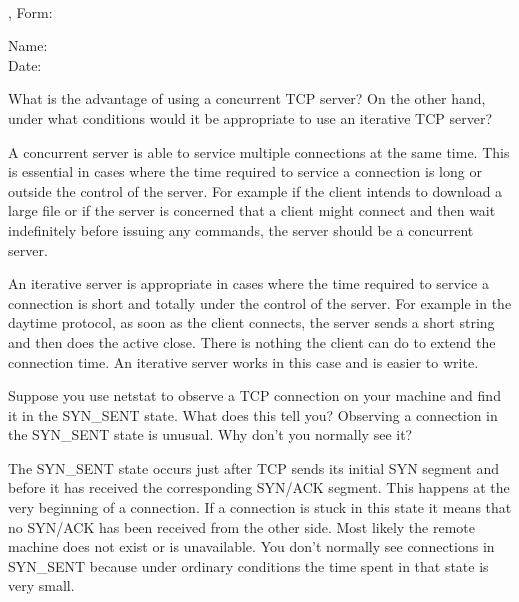 \documentclass[12pt]{examdesign}
\begin{document}
%
\begin{examtop}
  \parbox{3in}{\classdata \\
               \examtype, Form: }
  \hfill
  \parbox{3in}{\normalsize Name: \hrulefill \\[2.0ex]
                           Date: \hrulefill }
  \bigskip
\end{examtop}

\begin{shortanswer}
  \begin{question}
    What is the advantage of using a concurrent TCP server? On the other hand, under what
    conditions would it be appropriate to use an iterative TCP server?

    \begin{answer}
      A concurrent server is able to service multiple connections at the same time. This is
      essential in cases where the time required to service a connection is long or outside the
      control of the server. For example if the client intends to download a large file or if
      the server is concerned that a client might connect and then wait indefinitely before
      issuing any commands, the server should be a concurrent server.

      An iterative server is appropriate in cases where the time required to service a
      connection is short and totally under the control of the server. For example in the
      daytime protocol, as soon as the client connects, the server sends a short string and then
      does the active close. There is nothing the client can do to extend the connection time.
      An iterative server works in this case and is easier to write.
    \end{answer}
  \end{question}
  
\pagebreak

  \begin{question}
    Suppose you use netstat to observe a TCP connection on your machine and find it in the
    SYN\_SENT state. What does this tell you? Observing a connection in the SYN\_SENT state is
    unusual. Why don't you normally see it?

    \begin{answer}
      The SYN\_SENT state occurs just after TCP sends its initial SYN segment and before it has
      received the corresponding SYN/ACK segment. This happens at the very beginning of a
      connection. If a connection is stuck in this state it means that no SYN/ACK has been
      received from the other side. Most likely the remote machine does not exist or is
      unavailable. You don't normally see connections in SYN\_SENT because under ordinary
      conditions the time spent in that state is very small.
      

\end{answer}
\end{question}
\end{shortanswer}
\end{document}
